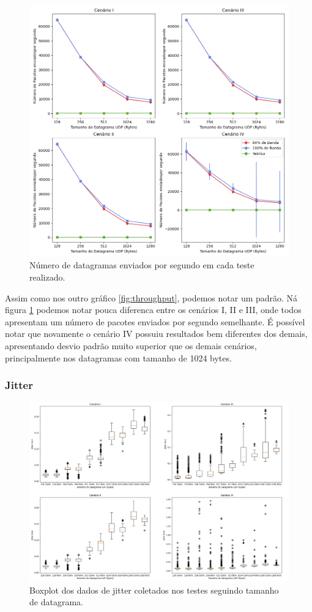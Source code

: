 \begin{figure}[H]
    \centering
    \includegraphics[width=0.9\linewidth]{sources/fig-pacotes.png}
    \caption{Número de datagramas enviados por segundo em cada teste realizado.}
    \label{fig:num pacotes}
\end{figure}

Assim como nos outro gráfico \ref{fig:throughput}, podemos notar um padrão. Ná figura \ref{fig:num pacotes} podemos notar pouca diferenca entre os cenários I, II e III, onde todos apresentam um número de pacotes enviados por segundo semelhante. É possível notar que novamente o cenário IV possuiu resultados bem diferentes dos demais, apresentando desvio padrão muito superior que os demais cenários, principalmente nos datagramas com tamanho de 1024 bytes.

\subsubsection{Jitter}

\begin{figure}[H]
    \centering
    \includegraphics[width=0.9\linewidth]{sources/fig-jitter.png}
    \caption{Boxplot dos dados de jitter coletados nos testes seguindo tamanho de datagrama.}
    \label{fig:jitter}
\end{figure}

